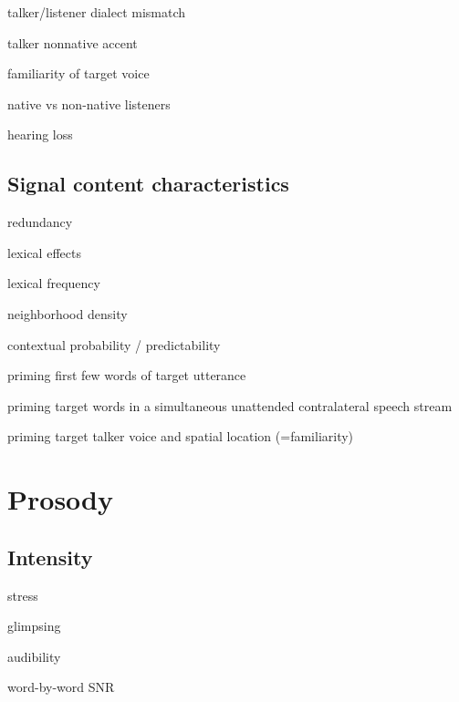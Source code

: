 \begin{itm}
	\item{talker/listener dialect mismatch}
	\item{talker nonnative accent}
	\item{familiarity of target voice}
	\item{native vs non-native listeners \citep{CookeEtAl2008, CookeEtAl2010, BrouwerEtAl2012}}
	\item{hearing loss}
\end{itm}

\subsection{Signal content characteristics}
\begin{itm}
	\item{redundancy}
	\item{lexical effects \citep{HoenEtAl2007, BoulengerEtAl2010, BrouwerEtAl2012}}
	\item{lexical frequency}
	\item{neighborhood density}
	\item{contextual probability / predictability}
	\item{priming first few words of target utterance \citep{FreymanEtAl2004}}
	\item{priming target words in a simultaneous unattended contralateral speech stream \citep{RivenezEtAl2006}}
	\item{priming target talker voice and spatial location (=familiarity) \citep{KiddEtAl2005a, KitterickEtAl2010}}
\end{itm}





\section{Prosody}

\subsection{Intensity}
\begin{itm}
	\item{stress}
	\item{glimpsing}
	\item{audibility}
	\item{word-by-word SNR}
\end{itm}

